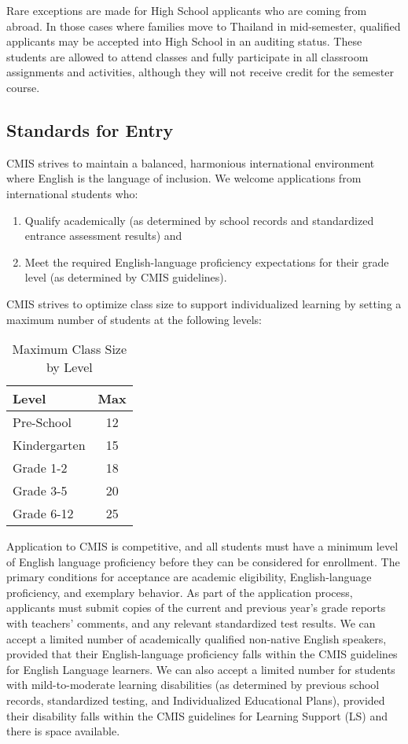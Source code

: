 Rare exceptions are made for High School applicants who are coming from abroad.  In those cases where families move to Thailand in mid-semester, qualified applicants may be accepted into High School in an auditing status.  These students are allowed to attend classes and fully participate in all classroom assignments and activities, although they will not receive credit for the semester course.  

\subsection{Standards for Entry}

CMIS strives to maintain a balanced, harmonious international environment where English is the language of inclusion.  We welcome applications from international students who:
\begin{enumerate}
\item Qualify academically (as determined by school records and standardized entrance assessment results) and
\item Meet the required English-language proficiency expectations for their grade level (as determined by CMIS guidelines).  
\end{enumerate}
CMIS strives to optimize class size to support individualized learning by setting a maximum number of students at the following levels:  

\begin{table}
\caption{Maximum Class Size by Level}
\label{table:5}
\begin{tabu}{|l|c|}
\hline
Level & Max \\
\hline
Pre-School &  12 \\
\hline
Kindergarten &  15 \\
\hline
Grade 1-2 &	18 \\
\hline
Grade 3-5 &	20 \\
\hline
Grade 6-12 &  25 \\
\hline
\end{tabu}
\end{table}


Application to CMIS is competitive, and all students must have a minimum level of English language proficiency before they can be considered for enrollment.  The primary conditions for acceptance are academic eligibility, English-language proficiency, and exemplary behavior.  As part of the application process, applicants must submit copies of the current and previous year’s grade reports with teachers' comments, and any relevant standardized test results.  We can accept a limited number of academically qualified non-native English speakers, provided that their English-language proficiency falls within the CMIS guidelines for English Language learners. We can also accept a limited number for students with mild-to-moderate learning disabilities (as determined by previous school records, standardized testing, and Individualized Educational Plans), provided their disability falls within the CMIS guidelines for Learning Support (LS) and there is space available.

